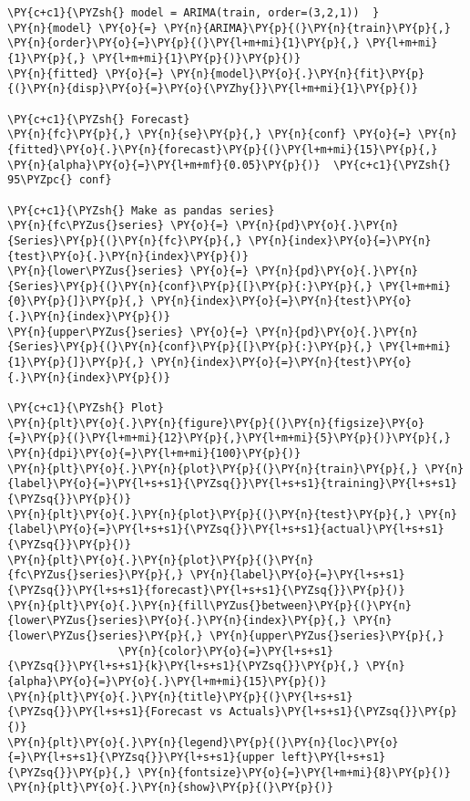 \begin{tcolorbox}[breakable, size=fbox, boxrule=1pt, pad at break*=1mm,colback=cellbackground, colframe=cellborder]
\begin{Verbatim}[commandchars=\\\{\}]
\PY{c+c1}{\PYZsh{} model = ARIMA(train, order=(3,2,1))  }
\PY{n}{model} \PY{o}{=} \PY{n}{ARIMA}\PY{p}{(}\PY{n}{train}\PY{p}{,} \PY{n}{order}\PY{o}{=}\PY{p}{(}\PY{l+m+mi}{1}\PY{p}{,} \PY{l+m+mi}{1}\PY{p}{,} \PY{l+m+mi}{1}\PY{p}{)}\PY{p}{)}  
\PY{n}{fitted} \PY{o}{=} \PY{n}{model}\PY{o}{.}\PY{n}{fit}\PY{p}{(}\PY{n}{disp}\PY{o}{=}\PY{o}{\PYZhy{}}\PY{l+m+mi}{1}\PY{p}{)}  

\PY{c+c1}{\PYZsh{} Forecast}
\PY{n}{fc}\PY{p}{,} \PY{n}{se}\PY{p}{,} \PY{n}{conf} \PY{o}{=} \PY{n}{fitted}\PY{o}{.}\PY{n}{forecast}\PY{p}{(}\PY{l+m+mi}{15}\PY{p}{,} \PY{n}{alpha}\PY{o}{=}\PY{l+m+mf}{0.05}\PY{p}{)}  \PY{c+c1}{\PYZsh{} 95\PYZpc{} conf}

\PY{c+c1}{\PYZsh{} Make as pandas series}
\PY{n}{fc\PYZus{}series} \PY{o}{=} \PY{n}{pd}\PY{o}{.}\PY{n}{Series}\PY{p}{(}\PY{n}{fc}\PY{p}{,} \PY{n}{index}\PY{o}{=}\PY{n}{test}\PY{o}{.}\PY{n}{index}\PY{p}{)}
\PY{n}{lower\PYZus{}series} \PY{o}{=} \PY{n}{pd}\PY{o}{.}\PY{n}{Series}\PY{p}{(}\PY{n}{conf}\PY{p}{[}\PY{p}{:}\PY{p}{,} \PY{l+m+mi}{0}\PY{p}{]}\PY{p}{,} \PY{n}{index}\PY{o}{=}\PY{n}{test}\PY{o}{.}\PY{n}{index}\PY{p}{)}
\PY{n}{upper\PYZus{}series} \PY{o}{=} \PY{n}{pd}\PY{o}{.}\PY{n}{Series}\PY{p}{(}\PY{n}{conf}\PY{p}{[}\PY{p}{:}\PY{p}{,} \PY{l+m+mi}{1}\PY{p}{]}\PY{p}{,} \PY{n}{index}\PY{o}{=}\PY{n}{test}\PY{o}{.}\PY{n}{index}\PY{p}{)}

\PY{c+c1}{\PYZsh{} Plot}
\PY{n}{plt}\PY{o}{.}\PY{n}{figure}\PY{p}{(}\PY{n}{figsize}\PY{o}{=}\PY{p}{(}\PY{l+m+mi}{12}\PY{p}{,}\PY{l+m+mi}{5}\PY{p}{)}\PY{p}{,} \PY{n}{dpi}\PY{o}{=}\PY{l+m+mi}{100}\PY{p}{)}
\PY{n}{plt}\PY{o}{.}\PY{n}{plot}\PY{p}{(}\PY{n}{train}\PY{p}{,} \PY{n}{label}\PY{o}{=}\PY{l+s+s1}{\PYZsq{}}\PY{l+s+s1}{training}\PY{l+s+s1}{\PYZsq{}}\PY{p}{)}
\PY{n}{plt}\PY{o}{.}\PY{n}{plot}\PY{p}{(}\PY{n}{test}\PY{p}{,} \PY{n}{label}\PY{o}{=}\PY{l+s+s1}{\PYZsq{}}\PY{l+s+s1}{actual}\PY{l+s+s1}{\PYZsq{}}\PY{p}{)}
\PY{n}{plt}\PY{o}{.}\PY{n}{plot}\PY{p}{(}\PY{n}{fc\PYZus{}series}\PY{p}{,} \PY{n}{label}\PY{o}{=}\PY{l+s+s1}{\PYZsq{}}\PY{l+s+s1}{forecast}\PY{l+s+s1}{\PYZsq{}}\PY{p}{)}
\PY{n}{plt}\PY{o}{.}\PY{n}{fill\PYZus{}between}\PY{p}{(}\PY{n}{lower\PYZus{}series}\PY{o}{.}\PY{n}{index}\PY{p}{,} \PY{n}{lower\PYZus{}series}\PY{p}{,} \PY{n}{upper\PYZus{}series}\PY{p}{,} 
                 \PY{n}{color}\PY{o}{=}\PY{l+s+s1}{\PYZsq{}}\PY{l+s+s1}{k}\PY{l+s+s1}{\PYZsq{}}\PY{p}{,} \PY{n}{alpha}\PY{o}{=}\PY{o}{.}\PY{l+m+mi}{15}\PY{p}{)}
\PY{n}{plt}\PY{o}{.}\PY{n}{title}\PY{p}{(}\PY{l+s+s1}{\PYZsq{}}\PY{l+s+s1}{Forecast vs Actuals}\PY{l+s+s1}{\PYZsq{}}\PY{p}{)}
\PY{n}{plt}\PY{o}{.}\PY{n}{legend}\PY{p}{(}\PY{n}{loc}\PY{o}{=}\PY{l+s+s1}{\PYZsq{}}\PY{l+s+s1}{upper left}\PY{l+s+s1}{\PYZsq{}}\PY{p}{,} \PY{n}{fontsize}\PY{o}{=}\PY{l+m+mi}{8}\PY{p}{)}
\PY{n}{plt}\PY{o}{.}\PY{n}{show}\PY{p}{(}\PY{p}{)}
\end{Verbatim}
\end{tcolorbox}

